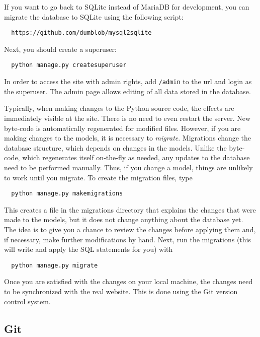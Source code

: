 \documentclass{article}
\begin{document}
If you want to go back to SQLite instead of MariaDB for development, you can migrate the database to SQLite using the following script:
\begin{verbatim}
  https://github.com/dumblob/mysql2sqlite
\end{verbatim}

Next, you should create a superuser:
\begin{lstlisting}
  python manage.py createsuperuser
\end{lstlisting}
In order to access the site with admin rights, add \verb+/admin+ to the url and login as the superuser. The admin page allows editing of all data stored in the database.

Typically, when making changes to the Python source code, the effects are immediately visible at the site. There is no need to even restart the server. New byte-code is automatically regenerated for modified files. However, if you are making changes to the models, it is necessary to \textit{migrate}. Migrations change the database structure, which depends on changes in the models. Unlike the byte-code, which regenerates itself on-the-fly as needed, any updates to the database need to be performed manually. Thus, if you change a model, things are unlikely to work until you migrate. To create the migration files, type
\begin{lstlisting}
  python manage.py makemigrations
\end{lstlisting}
This creates a file in the migrations directory that explains the changes that were made to the models, but it does not change anything about the database yet. The idea is to give you a chance to review the changes before applying them and, if necessary, make further modifications by hand. Next, run the migrations (this will write and apply the SQL statements for you) with
\begin{lstlisting}
  python manage.py migrate
\end{lstlisting}

Once you are satisfied with the changes on your local machine, the changes
need to be synchronized with the real website. This is done using the Git version control system.

\subsection{Git}
\end{document}
